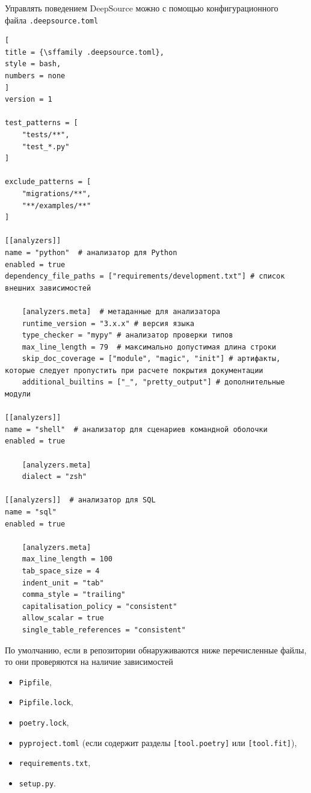\documentclass[%
	11pt,
	a4paper,
	utf8,
		]{article}
\begin{document}
Управлять поведением DeepSource можно с помощью конфигурационного \\файла \texttt{.deepsource.toml}
\begin{lstlisting}[
title = {\sffamily .deepsource.toml},
style = bash,
numbers = none	
]
version = 1

test_patterns = [
    "tests/**",
    "test_*.py"
]

exclude_patterns = [
    "migrations/**",
    "**/examples/**"
]

[[analyzers]]
name = "python"  # анализатор для Python
enabled = true
dependency_file_paths = ["requirements/development.txt"] # список внешних зависимостей

    [analyzers.meta]  # метаданные для анализатора
    runtime_version = "3.x.x" # версия языка
    type_checker = "mypy" # анализатор проверки типов
    max_line_length = 79  # максимально допустимая длина строки
    skip_doc_coverage = ["module", "magic", "init"] # артифакты, которые следует пропустить при расчете покрытия документации
    additional_builtins = ["_", "pretty_output"] # дополнительные модули
    
[[analyzers]]
name = "shell"  # анализатор для сценариев командной оболочки
enabled = true

    [analyzers.meta]
    dialect = "zsh"

[[analyzers]]  # анализатор для SQL
name = "sql"
enabled = true

    [analyzers.meta]
    max_line_length = 100
    tab_space_size = 4
    indent_unit = "tab"
    comma_style = "trailing"
    capitalisation_policy = "consistent"
    allow_scalar = true
    single_table_references = "consistent"
\end{lstlisting}

По умолчанию, если в репозитории обнаруживаются ниже перечисленные файлы, то они проверяются на наличие зависимостей
\begin{itemize}
	\item \texttt{Pipfile},
	
	\item \texttt{Pipfile.lock},
	
	\item \texttt{poetry.lock},
	
	\item \texttt{pyproject.toml} (если содержит разделы \texttt{[tool.poetry]} или \texttt{[tool.fit]}),
	
	\item \texttt{requirements.txt},
	
	\item \texttt{setup.py}.
\end{itemize}
\end{document}

